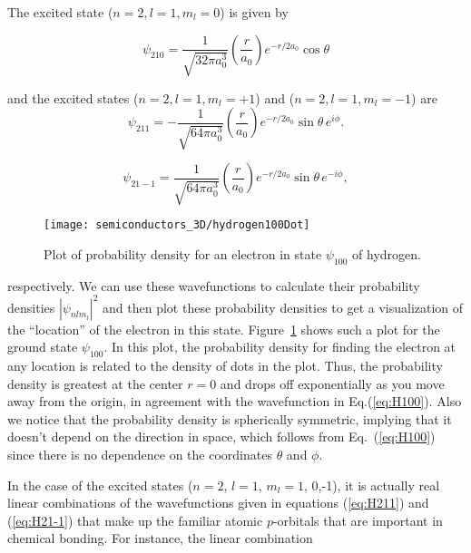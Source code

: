 \noindent The excited state ($n=2, l=1, m_l=0$) is given by

\begin{equation}
\psi_{210} = \frac{1}{\sqrt{32\pi a_0^3}} \left( \frac{r}{a_0} \right)
e^{-r/2a_0} \cos{\theta}
\label{eq:H210}
\end{equation}

\noindent and the excited states ($n=2, l=1, m_l=+1$) and ($n=2, l=1,
m_l=-1$) are
\begin{equation}
\psi_{211} = -\frac{1}{\sqrt{64\pi a_0^3}} \left( \frac{r}{a_0}
\right) e^{-r/2a_0} \sin{\theta}\, e^{i\phi}.
\label{eq:H211}
\end{equation}

\begin{equation}
\psi_{21-1} = \frac{1}{\sqrt{64\pi a_0^3}} \left( \frac{r}{a_0}
\right) e^{-r/2a_0} \sin{\theta}\, e^{-i\phi} ,
\label{eq:H21-1}
\end{equation}

\begin{figure}
\begin{center}
\texttt{[image: semiconductors\_3D/hydrogen100Dot]}
\end{center}
\caption{Plot of probability density for an electron in state
  $\psi_{100}$ of hydrogen.}
\label{fig:hydrogen100Dot}
\end{figure}
\noindent respectively. We can use these wavefunctions to calculate
their probability densities $\left|\psi_{nlm_l}\right|^2$ and then
plot these probability densities to get a visualization of the
``location'' of the electron in this state.
Figure~\ref{fig:hydrogen100Dot} shows such a plot for the ground state
$\psi_{100}$.  In this plot, the probability density for finding the
electron at any location is related to the density of dots in the
plot.  Thus, the probability density is greatest at the center $r=0$
and drops off exponentially as you move away from the origin, in
agreement with the wavefunction in Eq.(\ref{eq:H100}). Also we notice
that the probability density is spherically symmetric, implying that
it doesn't depend on the direction in space, which follows from
Eq.~(\ref{eq:H100}) since there is no dependence on the coordinates
$\theta$ and $\phi$.

In the case of the excited states ($n=2$, $l=1$, $m_l=1$, 0,-1), it is
actually real linear combinations of the wavefunctions given in
equations (\ref{eq:H211}) and (\ref{eq:H21-1}) that make up the
familiar atomic $p$-orbitals that are important in chemical
bonding. For instance, the linear combination

